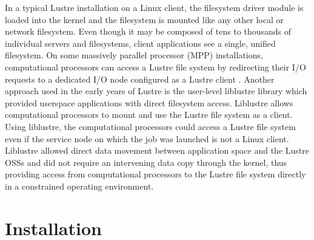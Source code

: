 \documentclass[9pt,twocolumn,twoside]{styles/osajnl}
\begin{document}
In a typical Lustre installation on a Linux client, the filesystem
driver module is loaded into the kernel and the filesystem is mounted
like any other local or network filesystem. Even though it may be
composed of tens to thousands of individual servers and filesystems,
client applications see a single, unified filesystem. On some
massively parallel processor (MPP) installations, computational
processors can access a Lustre file system by redirecting their I/O
requests to a dedicated I/O node configured as a Lustre client
\cite{www-bluegene-wikipedia}. Another approach used in the early
years of Lustre is the user-level liblustre library which provided
userspace applications with direct filesystem access. Liblustre allows
computational processors to mount and use the Lustre file system as a
client. Using liblustre, the computational processors could access a
Lustre file system even if the service node on which the job was
launched is not a Linux client. Liblustre allowed direct data movement
between application space and the Lustre OSSs and did not require an
intervening data copy through the kernel, thus providing access from
computational processors to the Lustre file system directly in a
constrained operating environment.

\section{Installation}
\end{document}
